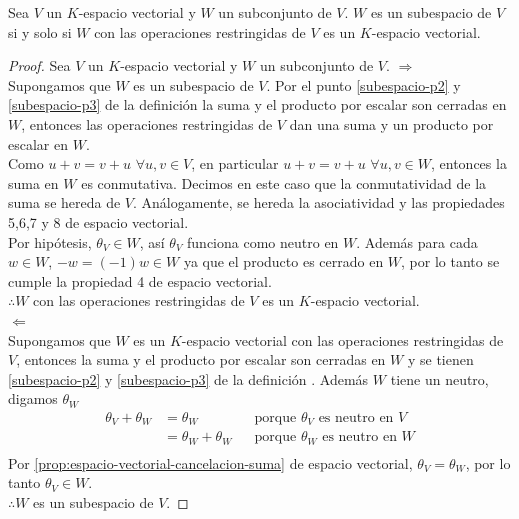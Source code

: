 \begin{proposition}{}{}
    Sea $V$ un $K$-espacio vectorial y $W$ un subconjunto de $V$. $W$ es un subespacio de $V$ si y solo si $W$ con las operaciones restringidas de $V$ es un $K$-espacio vectorial.
\end{proposition}
\begin{proof}
    Sea $V$ un $K$-espacio vectorial y $W$ un subconjunto de $V$. 
    $\Rightarrow$\\
    Supongamos que $W$ es un subespacio de $V$. Por el punto \ref{subespacio-p2} y \ref{subespacio-p3} de la definición  la suma y el producto por escalar son cerradas en $W$, entonces las operaciones restringidas de $V$ dan una suma y un producto por escalar en $W$.\\

    Como $u+v = v+u \, \, \forall u,v \in V$, en particular $u+v = v+u \, \, \forall u,v \in W$, entonces la suma en $W$ es conmutativa. Decimos en este caso que la conmutatividad de la suma se hereda de $V$. Análogamente, se hereda la asociatividad y las propiedades 5,6,7 y 8 de espacio vectorial.\\

    Por hipótesis, $\theta_V \in W$, así $\theta_V$ funciona como neutro en $W$. Además para cada $w \in W$, $-w = (-1)w \in W$ ya que el producto es cerrado en $W$, por lo tanto se cumple la propiedad 4 de espacio vectorial.\\
    
    $\therefore W$ con las operaciones restringidas de $V$ es un $K$-espacio vectorial.\\
    
    $\Leftarrow$\\
    Supongamos que $W$ es un $K$-espacio vectorial con las operaciones restringidas de $V$, entonces la suma y el producto por escalar son cerradas en $W$ y se tienen \ref{subespacio-p2} y \ref{subespacio-p3} de la definición . Además $W$ tiene un neutro, digamos $\theta_W$\\
    \begin{align*}
        \theta_V + \theta_W &= \theta_W && \text{porque } \theta_V \text{ es neutro en } V\\
        &= \theta_W + \theta_W && \text {porque } \theta_W \text{ es neutro en } W\\
    \end{align*}
    Por \ref{prop:espacio-vectorial-cancelacion-suma} de espacio vectorial, $\theta_V = \theta_W$, por lo tanto $\theta_V \in W$.\\
    $\therefore W$ es un subespacio de $V$.
\end{proof}


